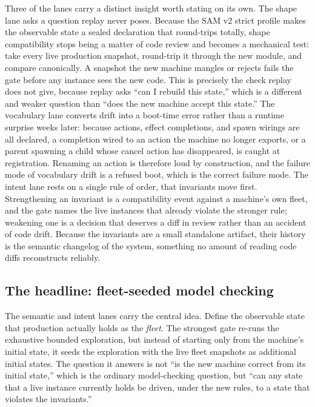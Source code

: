 \documentclass[11pt]{article}
\begin{document}
Three of the lanes carry a distinct insight worth stating on its own. The shape
lane asks a question replay never poses. Because the SAM v2 strict profile makes
the observable state a sealed declaration that round-trips totally, shape
compatibility stops being a matter of code review and becomes a mechanical test:
take every live production snapshot, round-trip it through the new module, and
compare canonically. A snapshot the new machine mangles or rejects fails the gate
before any instance sees the new code. This is precisely the check replay does
not give, because replay asks ``can I rebuild this state,'' which is a different
and weaker question than ``does the new machine accept this state.'' The
vocabulary lane converts drift into a boot-time error rather than a runtime
surprise weeks later: because actions, effect completions, and spawn wirings are
all declared, a completion wired to an action the machine no longer exports, or a
parent spawning a child whose cancel action has disappeared, is caught at
registration. Renaming an action is therefore loud by construction, and the
failure mode of vocabulary drift is a refused boot, which is the correct failure
mode. The intent lane rests on a single rule of order, that invariants move
first. Strengthening an invariant is a compatibility event against a machine's
own fleet, and the gate names the live instances that already violate the
stronger rule; weakening one is a decision that deserves a diff in review rather
than an accident of code drift. Because the invariants are a small standalone
artifact, their history is the semantic changelog of the system, something no
amount of reading code diffs reconstructs reliably.

\subsection{The headline: fleet-seeded model checking}\label{sub:seeded}

The semantic and intent lanes carry the central idea. Define the observable
state that production actually holds as the \emph{fleet}. The strongest gate
re-runs the exhaustive bounded exploration, but instead of starting only from
the machine's initial state, it seeds the exploration with the live fleet
snapshots as additional initial states. The question it answers is not ``is the
new machine correct from its initial state,'' which is the ordinary
model-checking question, but ``can any state that a live instance currently
holds be driven, under the new rules, to a state that violates the
invariants.''
\end{document}
